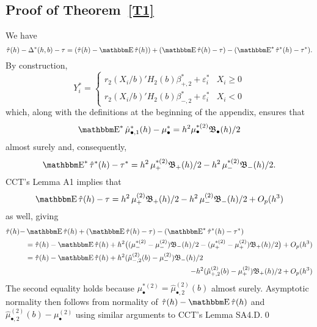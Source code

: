 \documentclass[12pt,fleqn]{article}
\begin{document}
\subsection{Proof of Theorem~\ref{T1}}
We have
\begin{equation*}
  \hat\tau(h) - \Delta^*(h,b) - \tau = (\hat\tau(h) - \E \hat \tau(h)) +
  (\E \hat \tau(h) - \tau) - (\E^* \hat \tau^*(h) - \tau^*).
\end{equation*}
By construction,
\begin{equation*}
  Y_i^* =
  \begin{cases}
    r_2(X_i/b)'H_2(b) \beta_{+,2}^* + \varepsilon_i^* & X_i \geq 0 \\
    r_2(X_i/b)'H_2(b) \beta_{-,2}^* + \varepsilon_i^* & X_i < 0
  \end{cases}
\end{equation*}
which, along with the definitions at the beginning of the appendix,
ensures that
\begin{align*}
  \E^* \hat\mu_{\bullet,1}^*(h) - \mu_{\bullet}^{*}
  = h^{2} \mu_{\bullet}^{*(2)} \Bf_{\bullet}(h)/2
\end{align*}
almost surely and, consequently,
\begin{equation*}
  \E^* \hat\tau^*(h) - \tau^{*} = h^2\, \mu_+^{*(2)} \Bf_+(h)/2
  - h^2\, \mu_{-}^{*(2)} \Bf_{-}(h)/2.
\end{equation*}
CCT's Lemma A1 implies that
\begin{equation*}
  \E \hat\tau(h) - \tau = h^2\, \mu_+^{(2)} \Bf_+(h)/2
  - h^2\, \mu_{-}^{(2)} \Bf_{-}(h)/2 + O_p(h^3)
\end{equation*}
as well, giving
\begin{align}
  \hat\tau(h) - & \E \hat\tau(h) + (\E \hat\tau(h) - \tau) - (\E^* \hat\tau^*(h) - \tau^*)\notag \\
  &= \hat\tau(h) - \E\hat\tau(h)
   + h^2 \big((\mu_{-}^{*(2)} - \mu_{-}^{(2)}) \Bf_{-}(h) /2
   - (\mu_+^{*(2)}-\mu_+^{(2)}) \Bf_{+}(h) / 2 \big) + O_p(h^{3}) \notag \\
  \label{eq:6}
  &= \hat\tau(h) - \E\hat\tau(h)
   + h^2 (\hat\mu_{-,2}^{(2)}(b) - \mu_-^{(2)}) \Bf_{-}(h) /2 \\
  \notag
  &\pushright{- h^2 (\hat\mu_{+,2}^{(2)}(b) - \mu_+^{(2)}) \Bf_{+}(h) / 2
   + O_p(h^{3})}
\end{align}
The second equality holds because
$\mu_\bullet^{*(2)} = \hat\mu_{\bullet,2}^{(2)}(b)$ almost surely. Asymptotic
normality then follows from normality of $\hat\tau(h) - \E\hat\tau(h)$ and
$\hat\mu_{\bullet,2}^{(2)}(b) - \mu_\bullet^{(2)}$ using similar arguments to
CCT's Lemma SA4.D.\qed
\end{document}

